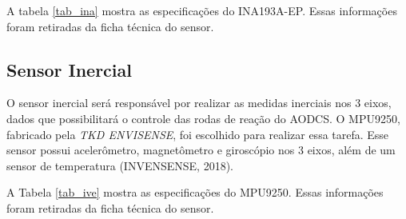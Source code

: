 A tabela \ref{tab_ina} mostra as especificações do INA193A-EP. Essas informações foram retiradas da ficha técnica do sensor.

\begin{table}[h]
\centering
\caption{Informações técnicas do INA193A-EP.}
\label{tab_ina}
\end{table}


\subsection{Sensor Inercial}

O sensor inercial será responsável por realizar as medidas inerciais nos 3 eixos, dados que possibilitará o controle das rodas de reação do AODCS. O MPU9250, fabricado pela \textit{TKD ENVISENSE}, foi escolhido para realizar essa tarefa. Esse sensor possui acelerômetro, magnetômetro e giroscópio nos 3 eixos, além de um sensor de temperatura (INVENSENSE, 2018).

A Tabela \ref{tab_ive} mostra as especificações do MPU9250. Essas informações foram retiradas da ficha técnica do sensor.

